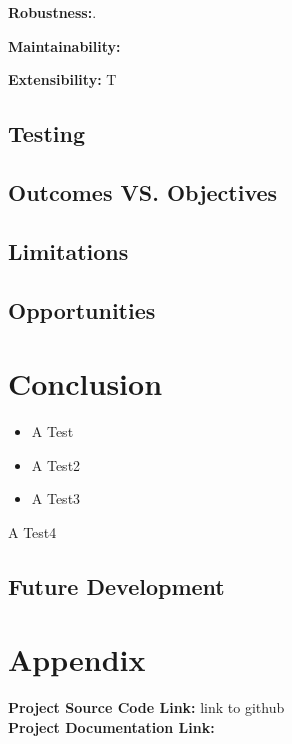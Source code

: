 \par \textbf{Robustness:}.

\par \textbf{Maintainability:}

\par \textbf{Extensibility:} T

\section{Testing}

\section{Outcomes VS. Objectives}

\section{Limitations}

\section{Opportunities}

\chapter{Conclusion}


\begin{itemize}
\item A Test

\item A Test2
\item A Test3
\end{itemize}
A Test4
\section{Future Development}

\chapter{Appendix}

\textbf{Project Source Code Link: }link to github \\
\textbf{Project Documentation Link: } \\

